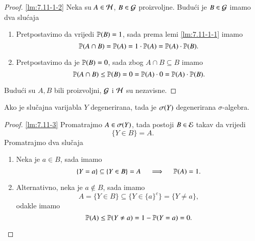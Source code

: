 \begin{rj}[\ref{zad:7.11}]
    \begin{proof}{\ref{lm:7.11-1-2}}
        Neka su $A \in \mathcal{H}$, $B \in \mathcal{G}$ proizvoljne.
        Budu\' ci je $B \in \mathcal{G}$ imamo dva slu\' caja
        \begin{enumerate}[label=($\arabic*^\circ$)]
            \item Pretpostavimo da vrijedi $\mathbb{P} (B) = 1$, sada prema lemi \ref{lm:7.11-1-1} imamo
            \begin{equation*}
                \mathbb{P} (A \cap B) = \mathbb{P} (A) = 1 \cdot \mathbb{P} (A) = \mathbb{P} (A) \cdot \mathbb{P} (B).
            \end{equation*}
            \item Pretpostavimo da je $\mathbb{P} (B) = 0$, sada zbog $A \cap B \subseteq B$ imamo
            \begin{equation*}
                \mathbb{P} (A \cap B) \leq \mathbb{P} (B) = 0 = \mathbb{P} (A) \cdot 0 = \mathbb{P} (A) \cdot \mathbb{P} (B).
            \end{equation*}
        \end{enumerate}
        Budu\' ci su $A, B$ bili proizvoljni, $\mathcal{G}$ i $\mathcal{H}$ su nezavisne.
    \end{proof}

    \begin{lm}  \label{lm:7.11-3}
        Ako je slu\v cajna varijabla $Y$ degenerirana, tada je $\sigma({Y})$ degenerirana $\sigma$-algebra.
    \end{lm}

    \begin{proof}{\ref{lm:7.11-3}}
        Promatrajmo $A \in \sigma({Y})$, tada postoji $B \in \mathcal{E}$ takav da vrijedi
        \begin{equation*}
            \{Y \in B\} = A.
        \end{equation*}
        Promatrajmo dva slu\v caja
        \begin{enumerate}[label=$(\arabic*^\circ)$]
            \item Neka je $a \in B$, sada imamo
            \begin{equation*}
                \{Y = a\} \subseteq \{Y \in B\} = A \quad \implies \quad \mathbb{P} (A) = 1.
            \end{equation*}
            \item Alternativno, neka je $a \notin B$, sada imamo
            \begin{equation*}
                A = \{ Y \in B\} \subseteq \big\{ Y \in \{a\}^c \big\} = \{ Y \neq a \},
            \end{equation*}
            odakle imamo
            \begin{equation*}
                \mathbb{P} (A) \leq \mathbb{P} (Y \neq a) = 1 - \mathbb{P} (Y = a) = 0.
            \end{equation*}
        \end{enumerate}
    \end{proof}


\end{rj}
